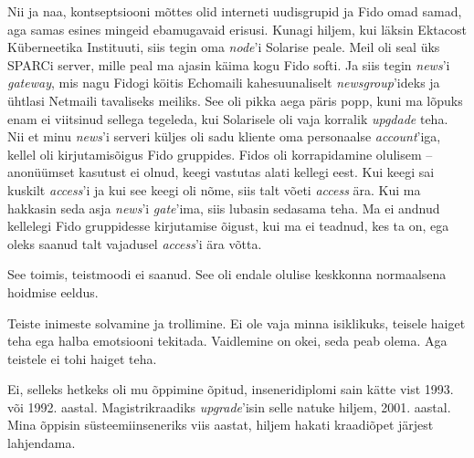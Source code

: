 Nii ja naa, kontseptsiooni mõttes olid interneti uudisgrupid ja Fido omad 
samad, aga samas esines mingeid ebamugavaid erisusi. Kunagi hiljem, kui läksin
Ektacost Küberneetika Instituuti, siis tegin oma 
\emph{node}'i Solarise peale. Meil oli seal üks 
SPARCi server, mille peal ma ajasin käima kogu Fido softi. 
Ja siis tegin \emph{news}'i \emph{gateway}, 
mis nagu Fidogi köitis Echomaili kahesuunaliselt \emph{newsgroup}'ideks ja 
ühtlasi Netmaili tavaliseks meiliks. See oli pikka aega päris popp, kuni ma lõpuks enam ei viitsinud sellega tegeleda, kui Solarisele oli vaja korralik \emph{upgdade} teha. Nii et minu \emph{news}'i 
serveri küljes oli sadu kliente oma personaalse \emph{account}'iga, kellel oli kirjutamisõigus Fido gruppides. 
Fidos oli korrapidamine olulisem – anonüümset 
kasutust ei olnud, keegi vastutas alati kellegi eest. Kui keegi sai kuskilt
\emph{access}'i ja kui see keegi oli nõme, siis talt võeti \emph{access} 
ära. Kui ma hakkasin seda asja \emph{news}'i \emph{gate}'ima, siis lubasin sedasama 
teha. Ma ei andnud kellelegi Fido gruppidesse kirjutamise õigust, kui ma 
ei teadnud, kes ta on, ega oleks saanud talt vajadusel \emph{access}'i ära võtta. 


See toimis, teistmoodi ei saanud. See oli endale olulise keskkonna normaalsena hoidmise 
eeldus. 


Teiste inimeste solvamine ja trollimine. Ei ole vaja minna isiklikuks, teisele haiget teha ega halba emotsiooni tekitada. Vaidlemine on okei, seda peab olema. Aga teistele ei tohi haiget teha. 


Ei, selleks hetkeks oli mu õppimine õpitud, inseneridiplomi sain kätte vist 1993. või 1992. aastal. Magistrikraadiks \emph{upgrade}'isin selle natuke 
hiljem, 2001. aastal. Mina õppisin süsteemiinseneriks viis aastat, hiljem 
hakati kraadiõpet järjest lahjendama.  


